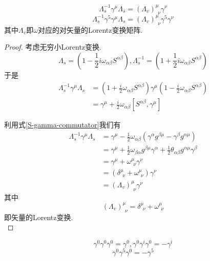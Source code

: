 \begin{theorem}
    \begin{equation}
        \Lambda_s^{-1}\gamma^\mu\Lambda_s=(\Lambda_v)^\mu_{~~\nu}\gamma^\nu
    \end{equation}
    \begin{equation}
        \Lambda_s^{-1}\gamma^5\gamma^\mu\Lambda_s=(\Lambda_v)^\mu_{~~\nu}\gamma^5\gamma^\nu
    \end{equation}
    其中$\Lambda_v$即$\omega$对应的对矢量的Lorentz变换矩阵.
\end{theorem}
\begin{proof}
    考虑无穷小Lorentz变换.
    \begin{equation}
        \Lambda_s=(1-\frac12i\omega_{\alpha\beta}S^{\alpha\beta}), \Lambda_s^{-1}=(1+\frac12i\omega_{\alpha\beta}S^{\alpha\beta})
    \end{equation}
    于是
    \begin{align}
        \Lambda_s^{-1}\gamma^\mu\Lambda_s&=(1+\frac i2\omega_{\alpha\beta}S^{\alpha\beta})\gamma^\mu(1-\frac i2\omega_{\alpha\beta}S^{\alpha\beta})\\
        &=\gamma^\mu+\frac i2\omega_{\alpha\beta}[S^{\alpha\beta}, \gamma^\mu]
    \end{align}

    利用式\eqref{S-gamma-commutator}我们有
    \begin{align}
        \Lambda_s^{-1}\gamma^\mu\Lambda_s&=\gamma^\mu-\frac 12\omega_{\alpha\beta}(\gamma^\alpha g^{\beta\mu}-\gamma^\beta g^{\alpha\mu})\\
        &=\gamma^\mu+\frac12\omega_{\beta\alpha}g^{\beta\mu}\gamma^\alpha+\frac12\theta_{\alpha\beta}g^{\alpha\mu}\gamma^\beta\\
        &=\gamma^\mu+\omega^\mu_{~~\nu}\gamma^\nu\\
        &=(\delta^\mu_{~~\nu}+\omega^\mu_{~~\nu})\gamma^\nu\\
        &=(\Lambda_v)^\mu_{~~\nu}\gamma^\nu
    \end{align}
    其中
    \begin{equation}
        (\Lambda_v)^\mu_{~~\nu}=\delta^\mu_{~~\nu}+\omega^\mu_{~~\nu}
    \end{equation}
    即矢量的Lorentz变换.\\
\end{proof}

\begin{theorem}
    \begin{equation}
        \gamma^0\gamma^0\gamma^0=\gamma^0, \gamma^0\gamma^i\gamma^0=-\gamma^i
    \end{equation}
    \begin{equation}
        \gamma^0\gamma^5\gamma^0=-\gamma^5
    \end{equation}
\end{theorem}

